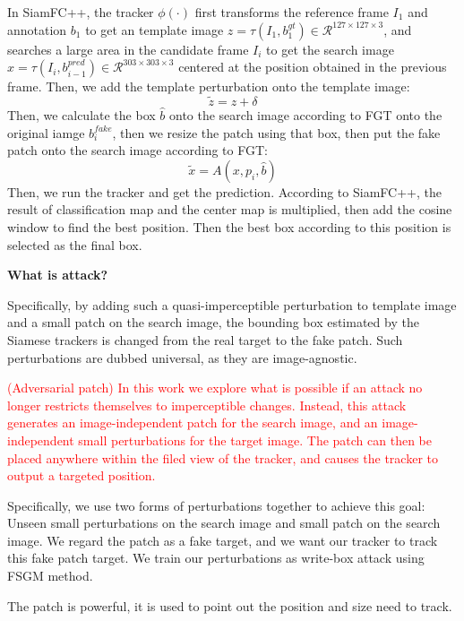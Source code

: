 \documentclass{article}
\begin{document}
In SiamFC++, the tracker $\phi(\cdot)$ first transforms the reference frame $I_1$ and annotation $b_1$ to get an template image $z = \tau (I_1, b^{gt}_1)\in \mathcal{R}^{127\times 127\times 3}$, and searches a large area in the candidate frame $I_i$ to get the search image $x = \tau(I_i, b_{i-1}^{pred})\in \mathcal{R}^{303\times 303 \times 3}$ centered at the position obtained in the previous frame.
Then, we add the template perturbation onto the template image:
\begin{equation}
\tilde z = z + \delta
\end{equation}
Then, we calculate the box $\hat b$ onto the search image according to FGT onto the original iamge $b^{fake}_i$, then we resize the patch using that box, then put the fake patch onto the search image according to FGT:
\begin{equation}
\tilde x = A(x, p_i, \hat b)
\end{equation}
Then, we run the tracker and get the prediction. According to SiamFC++, the result of classification map and the center map is multiplied, then add the cosine window to find the best position. Then the best box according to this position is selected as the final box.

\textbf{What is attack?}

Specifically, by adding such a quasi-imperceptible perturbation to template image and a small patch on the search image, the bounding box estimated by the Siamese trackers is changed from the real target to the fake patch. Such perturbations are dubbed universal, as they are image-agnostic.

\textcolor{red}{(Adversarial patch) In this work we explore what is possible if an attack no longer restricts themselves to imperceptible changes. Instead, this attack generates an image-independent patch for the search image, and an image-independent small perturbations for the target image. The patch can then be placed anywhere within the filed view of the tracker, and causes the tracker to output a targeted position.}

Specifically, we use two forms of perturbations together to achieve this goal: Unseen small perturbations on the search image and small patch on the search image. We regard the patch as a fake target, and we want our tracker to track this fake patch target. We train our perturbations as write-box attack using FSGM  method.

The patch is powerful, it is used to point out the position and size need to track.
\end{document}
